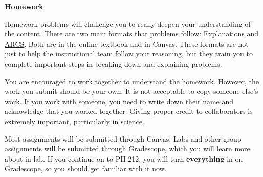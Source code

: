 \documentclass[]{article}
\begin{document}
\begin{TeacherMargin}
\noindent\textbf{Homework}

Homework problems will challenge you to really deepen your understanding of the content. There are two main formats that problems follow: \href{https://lipa.physics.oregonstate.edu/sec_what-is-motion.html}{\color{blue}Explanations} and \href{https://lipa.physics.oregonstate.edu/sec_real-world-context.html}{ARCS}. Both are in the online textbook and in Canvas. These formats are not just to help the instructional team follow your reasoning, but they train you to complete important steps in breaking down and explaining problems.

You are encouraged to work together to understand the homework. However, the work you submit should be your own. It is not acceptable to copy someone else's work. If you work with someone, you need to write down their name and acknowledge that you worked together. Giving proper credit to collaborators is extremely important, particularly in science.

Most assignments will be submitted through Canvas. Labs and other group assignments will be submitted through Gradescope, which you will learn more about in lab. If you continue on to PH 212, you will turn \textbf{everything} in on Gradescope, so you should get familiar with it now.
\end{TeacherMargin}
\end{document}
